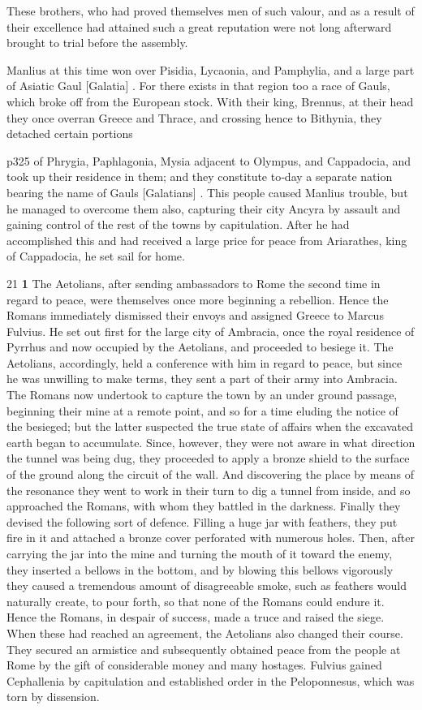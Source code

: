 These brothers, who had proved themselves men of such valour, and as a result of their excellence had attained such a great reputation were not long afterward brought to trial before the assembly.

Manlius at this time won over Pisidia, Lycaonia, and Pamphylia, and a large part of Asiatic Gaul [Galatia] . For there exists in that region too a race of Gauls, which broke off from the European stock. With their king, Brennus, at their head they once overran Greece and Thrace, and crossing hence to Bithynia, they detached certain portions

p325 of Phrygia, Paphlagonia, Mysia adjacent to Olympus, and Cappadocia, and took up their residence in them; and they constitute to\texthebrew{‑}day a separate nation bearing the name of Gauls [Galatians] . This people caused Manlius trouble, but he managed to overcome them also, capturing their city Ancyra by assault and gaining control of the rest of the towns by capitulation. After he had accomplished this and had received a large price for peace from Ariarathes, king of Cappadocia, he set sail for home.

21
\textbf{1} The Aetolians, after sending ambassadors to Rome the second time in regard to peace, were themselves once more beginning a rebellion. Hence the Romans immediately dismissed their envoys and assigned Greece to Marcus Fulvius. He set out first for the large city of Ambracia, once the royal residence of Pyrrhus and now occupied by the Aetolians, and proceeded to besiege it. The Aetolians, accordingly, held a conference with him in regard to peace, but since he was unwilling to make terms, they sent a part of their army into Ambracia. The Romans now undertook to capture the town by an under ­ground passage, beginning their mine at a remote point, and so for a time eluding the notice of the besieged; but the latter suspected the true state of affairs when the excavated earth began to accumulate. Since, however, they were not aware in what direction the tunnel was being dug, they proceeded to apply a bronze shield to the surface of the ground along the circuit of the wall. And discovering the place by means of the resonance they went to work in their turn to dig a tunnel from inside, and so approached the Romans, with whom they battled in the darkness. Finally they devised the following sort of defence. Filling a huge jar with feathers, they put fire in it and attached a bronze cover perforated with numerous holes. Then, after carrying the jar into the mine and turning the mouth of it toward the enemy, they inserted a bellows in the bottom, and by blowing this bellows vigorously they caused a tremendous amount of disagreeable smoke, such as feathers would naturally create, to pour forth, so that none of the Romans could endure it. Hence the Romans, in despair of success, made a truce and raised the siege. When these had reached an agreement, the Aetolians also changed their course. They secured an armistice and subsequently obtained peace from the people at Rome by the gift of considerable money and many hostages. Fulvius gained Cephallenia by capitulation and established order in the Peloponnesus, which was torn by dissension.

